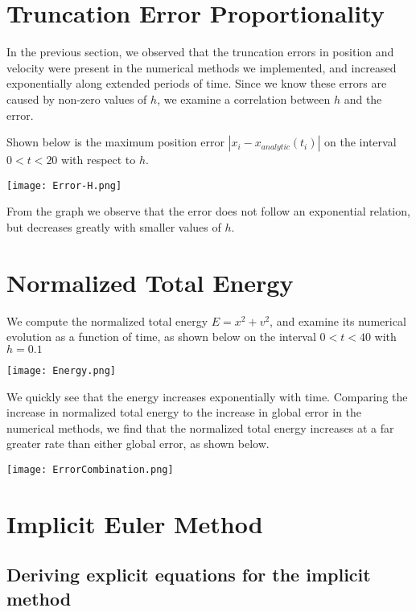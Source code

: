 \documentclass{scrartcl}
\begin{document}
\section{Truncation Error Proportionality}
In the previous section, we observed that the truncation errors in position and velocity were present in the numerical methods we implemented, and increased exponentially along extended periods of time. Since we know these errors are caused by non-zero values of $h$, we examine a correlation between $h$ and the error. \par 
Shown below is the maximum position error $|x_i - x_{analytic} (t_i)|$ on the interval $0<t<20$ with respect to $h$.
\begin{center}
\texttt{[image: Error-H.png]}
\end{center}
From the graph we observe that the error does not follow an exponential relation, but decreases greatly with smaller values of $h$.
\section{Normalized Total Energy}
We compute the normalized total energy $E = x^2 + v^2$, and examine its numerical evolution as a function of time, as shown below on the interval $0<t<40$ with $h=0.1$
\begin{center}
\texttt{[image: Energy.png]}
\end{center}
We quickly see that the energy increases exponentially with time. Comparing the increase in normalized total energy to the increase in global error in the numerical methods, we find that the normalized total energy increases at a far greater rate than either global error, as shown below.
\begin{center}
\texttt{[image: ErrorCombination.png]}
\end{center}
\section{Implicit Euler Method}
\subsection{Deriving explicit equations for the implicit method}
\end{document}
